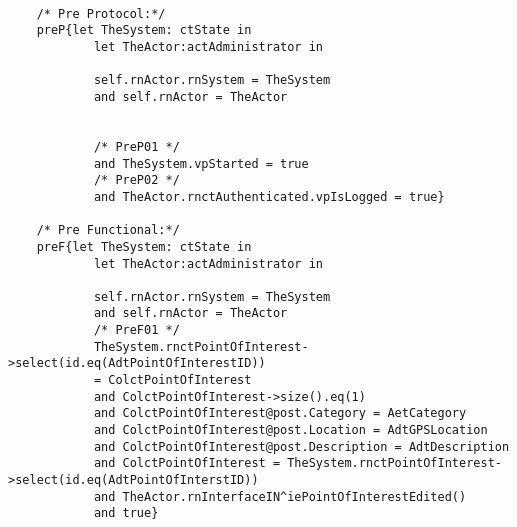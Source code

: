 	\scriptsize
	\vspace{0.5cm}
	\begin{lstlisting}[style=MessirStyle,firstnumber=auto,captionpos=b,caption={\msrmessir (MCL-oriented) specification of the operation \emph{oeEditPointOfInterest}.},label=OM-actAdministrator-oeEditPointOfInterest-MCL-LST]

	/* Pre Protocol:*/ 
	preP{let TheSystem: ctState in
	  		let TheActor:actAdministrator in
	  
	 		self.rnActor.rnSystem = TheSystem
	  		and self.rnActor = TheActor
	  		
	  
			/* PreP01 */
	  		and TheSystem.vpStarted = true
			/* PreP02 */
	  		and TheActor.rnctAuthenticated.vpIsLogged = true}
	
	/* Pre Functional:*/
	preF{let TheSystem: ctState in
	  		let TheActor:actAdministrator in
	   
	 		self.rnActor.rnSystem = TheSystem
	  		and self.rnActor = TheActor
			/* PreF01 */
	  		TheSystem.rnctPointOfInterest->select(id.eq(AdtPointOfInterestID))
	  		= ColctPointOfInterest
	  		and ColctPointOfInterest->size().eq(1)
	 		and ColctPointOfInterest@post.Category = AetCategory
	 		and ColctPointOfInterest@post.Location = AdtGPSLocation
	 		and ColctPointOfInterest@post.Description = AdtDescription
	 		and ColctPointOfInterest = TheSystem.rnctPointOfInterest->select(id.eq(AdtPointOfInterstID))
	 		and TheActor.rnInterfaceIN^iePointOfInterestEdited()
	 		and true}
	
	
	
	\end{lstlisting}
	\normalsize 
	
	
	
	





